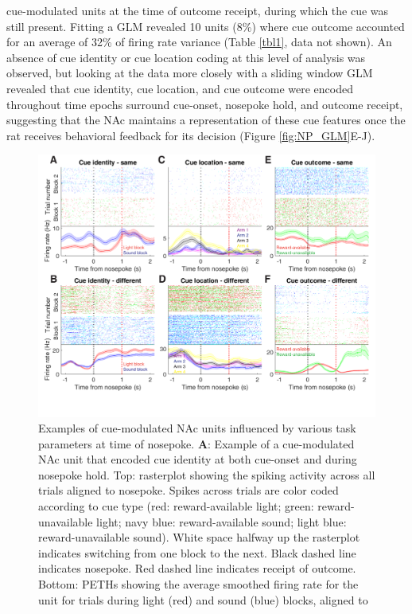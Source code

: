 \documentclass[11pt]{article}
\newcommand{\bsf}[1]{\textbf{#1}}
\begin{document}
cue-modulated units at the time of outcome receipt, during which the cue was
still present. Fitting a GLM revealed 10 units (8\%) where cue outcome accounted
for an average of 32\% of firing rate variance (Table \ref{tbl1}, data not
shown). An absence of cue identity or cue location coding at this level of analysis was observed,
but looking at the data more closely with a sliding window GLM revealed that
cue identity, cue location, and cue outcome were encoded throughout time epochs surround cue-onset, nosepoke hold, and outcome receipt,
suggesting that the NAc maintains a representation of these cue features once the rat receives behavioral feedback for its decision (Figure \ref{fig:NP_GLM}E-J).

 \begin{figure}[ht!]
\centering
\includegraphics[width=\textwidth]{Fig 9 - NP Neural examples.pdf}
\caption{Examples of cue-modulated NAc units influenced by various task
parameters at time of nosepoke. \bsf{A}: Example of a cue-modulated NAc unit
that encoded cue identity at both cue-onset and during nosepoke hold. Top:
rasterplot showing the spiking activity across all trials aligned to
nosepoke. Spikes across trials are color coded according to cue type (red:
reward-available light; green: reward-unavailable light; navy blue:
reward-available sound; light blue: reward-unavailable sound). White space
halfway up the rasterplot indicates switching from one block to the
next. Black dashed line indicates nosepoke. Red dashed line indicates receipt
of outcome. Bottom: PETHs showing the average smoothed firing rate for the
unit for trials during light (red) and sound (blue) blocks, aligned to
}
\end{figure}
\end{document}
